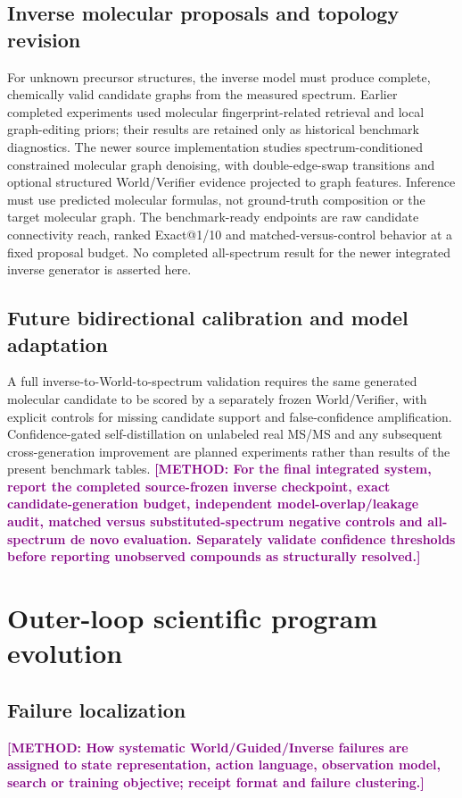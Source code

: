 \documentclass[12pt]{article}
\newcommand{\methodtodo}[1]{\textbf{\textcolor{purple}{[METHOD: #1]}}}
\begin{document}
\subsection{Inverse molecular proposals and topology revision}
For unknown precursor structures, the inverse model must produce complete, chemically valid candidate graphs from the measured spectrum. Earlier completed experiments used molecular fingerprint-related retrieval and local graph-editing priors; their results are retained only as historical benchmark diagnostics. The newer source implementation studies spectrum-conditioned constrained molecular graph denoising, with double-edge-swap transitions and optional structured World/Verifier evidence projected to graph features. Inference must use predicted molecular formulas, not ground-truth composition or the target molecular graph. The benchmark-ready endpoints are raw candidate connectivity reach, ranked Exact@1/10 and matched-versus-control behavior at a fixed proposal budget. No completed all-spectrum result for the newer integrated inverse generator is asserted here.

\subsection{Future bidirectional calibration and model adaptation}
A full inverse-to-World-to-spectrum validation requires the same generated molecular candidate to be scored by a separately frozen World/Verifier, with explicit controls for missing candidate support and false-confidence amplification. Confidence-gated self-distillation on unlabeled real MS/MS and any subsequent cross-generation improvement are planned experiments rather than results of the present benchmark tables.
\methodtodo{For the final integrated system, report the completed source-frozen inverse checkpoint, exact candidate-generation budget, independent model-overlap/leakage audit, matched versus substituted-spectrum negative controls and all-spectrum de novo evaluation. Separately validate confidence thresholds before reporting unobserved compounds as structurally resolved.}

\section{Outer-loop scientific program evolution}

\subsection{Failure localization}
\methodtodo{How systematic World/Guided/Inverse failures are assigned to state representation, action language, observation model, search or training objective; receipt format and failure clustering.}
\end{document}
